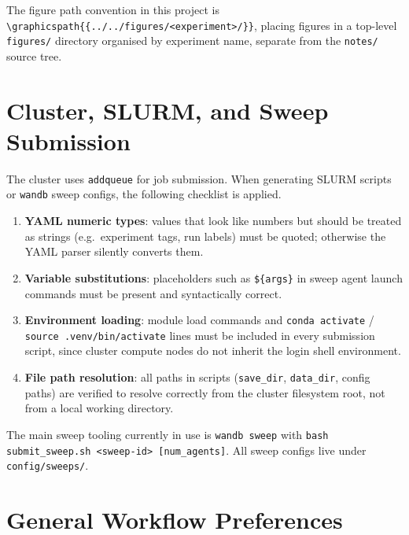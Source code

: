 \documentclass[11pt]{article}
\begin{document}
The figure path convention in this project is
\verb|\graphicspath{{../../figures/<experiment>/}}|, placing figures
in a top-level \texttt{figures/} directory organised by experiment
name, separate from the \texttt{notes/} source tree.

\section{Cluster, SLURM, and Sweep Submission}
\label{sec:cluster}

The cluster uses \texttt{addqueue} for job submission.  When generating
SLURM scripts or \texttt{wandb} sweep configs, the following checklist
is applied.

\begin{enumerate}[leftmargin=1.5em]
  \item \textbf{YAML numeric types}: values that look like numbers but
        should be treated as strings (e.g.\ experiment tags, run
        labels) must be quoted; otherwise the YAML parser silently
        converts them.
  \item \textbf{Variable substitutions}: placeholders such as
        \texttt{\$\{args\}} in sweep agent launch commands must be
        present and syntactically correct.
  \item \textbf{Environment loading}: module load commands and
        \texttt{conda activate} / \texttt{source .venv/bin/activate}
        lines must be included in every submission script, since
        cluster compute nodes do not inherit the login shell environment.
  \item \textbf{File path resolution}: all paths in scripts
        (\texttt{save\_dir}, \texttt{data\_dir}, config paths) are
        verified to resolve correctly from the cluster filesystem root,
        not from a local working directory.
\end{enumerate}

The main sweep tooling currently in use is \texttt{wandb sweep} with
\texttt{bash submit\_sweep.sh <sweep-id> [num\_agents]}.  All sweep
configs live under \texttt{config/sweeps/}.

\section{General Workflow Preferences}
\label{sec:general}
\end{document}
